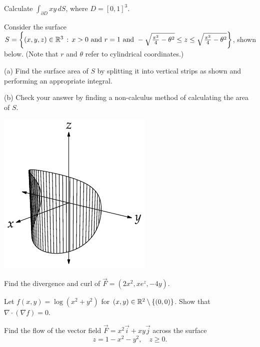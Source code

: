 \documentclass{watsonbook}
\begin{document}
\begin{aexercise}
  Calculate $\int_{\partial D}xy\,dS$, where $D=[0,1]^3$.
\end{aexercise}


\begin{aexercise}
  Consider the surface
  $S=\left\{(x,y,z)\in \mathbb{R}^3\,:\,x>0\text{ and }r = 1\text{ and
    }-\sqrt{\frac{\pi^2}{4}-\theta^2}\leq z\leq
    \sqrt{\frac{\pi^2}{4}-\theta^2}\right\}$, shown below. (Note that
  $r$ and $\theta$ refer to cylindrical coordinates.)

  (a) Find the surface area of $S$ by splitting it into vertical
  strips as shown and performing an appropriate integral. 

  (b) Check your answer by finding a non-calculus method of
  calculating the area of $S$.

\begin{center}
  \includegraphics{exercisefigures/label}
\end{center}
\end{aexercise}


\begin{aexercise}
  Find the divergence and curl of $\vec{F} = (2x^2, xe^z, -4y)$.
\end{aexercise}

\begin{aexercise}
  Let $f(x,y) = \log(x^2 + y^2)$ for
  $(x,y)\in \mathbb{R}^2 \setminus \{(0,0)\}$. Show that
  $\nabla \cdot (\nabla f) = 0$.
\end{aexercise}

\begin{aexercise}
Find the flow of the vector field $\vec{F} = x^2\vec{i} + xy\vec{j}$ across the surface 
\[
z = 1-x^2-y^2, \quad z \geq 0. 
\]
\end{aexercise}
\end{document}
